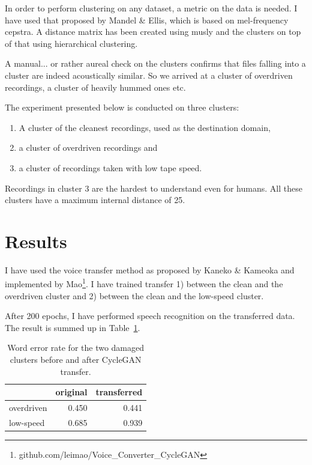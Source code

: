 \documentclass[12pt,a4paper]{report}
\begin{document}
In order to perform clustering on any dataset, a metric on the data is needed.
I have used that proposed by Mandel \& Ellis\cite{mandel2005song}, which
is based on mel-frequency cepstra. A distance matrix has been created using
musly\cite{schnitzer2011using} and the clusters on top of that using
hierarchical clustering\cite{johnson1967hierarchical}.

A manual... or rather aureal check on the clusters confirms that files falling
into a cluster are indeed acoustically similar. So we arrived at a cluster of
overdriven recordings, a cluster of heavily hummed ones etc.

The experiment presented below is conducted on three clusters:
\begin{enumerate}
\item{A cluster of the cleanest recordings, used as the destination domain,}
\item{a cluster of overdriven recordings and}
\item{a cluster of recordings taken with low tape speed.}
\end{enumerate}
Recordings in cluster 3 are the hardest to understand even for humans. All these
clusters have a maximum internal distance of 25.

\section{Results}

I have used the voice transfer method as proposed by Kaneko \&
Kameoka\cite{kaneko2017parallel} and implemented by
Mao\footnote{github.com/leimao/Voice\_Converter\_CycleGAN}. I have trained
transfer 1) between the clean and the overdriven cluster and 2) between the
clean and the low-speed cluster.

After 200 epochs, I have performed speech recognition on the transferred data.
The result is summed up in Table~\ref{tab:results}.

\begin{table}[htpb]
\caption{Word error rate for the two damaged clusters before and after CycleGAN
transfer.}\label{tab:results}
\centering
\begin{tabular}{|l||r|r|}
\hline
           & original & transferred \\
\hline
overdriven & 0.450 & 0.441 \\
low-speed  & 0.685 & 0.939 \\
\hline
\end{tabular}
\end{table}
\end{document}
